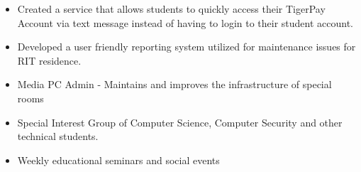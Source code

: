\documentclass[10pt,a4paper,ragged2e,withhyper]{altacv}
\begin{document}
\begin{paracol}{2}
\begin{itemize}
    
    \end{itemize}

\smallskip \smallskip
  
      
     
  \newline
\divider

    
    \begin{itemize}
    
    \item Created a service that allows students to quickly access their TigerPay Account via text message instead of having to login to their student account.
    
    \end{itemize}

\smallskip \smallskip
  
     

\newline
    \divider

   
    \begin{itemize}
\item Developed a user friendly reporting system utilized for maintenance issues for RIT residence. 
\end{itemize}
\smallskip \smallskip
        


\smallskip \smallskip
       
 

    
    \switchcolumn
    \smallskip
    

    
\begin{itemize}
\item Media PC Admin - Maintains and improves the infrastructure of special rooms
\item Special Interest Group of Computer Science, Computer Security and other technical students. 
\item Weekly educational seminars and social events
\end{itemize}


\end{paracol}
\end{document}
